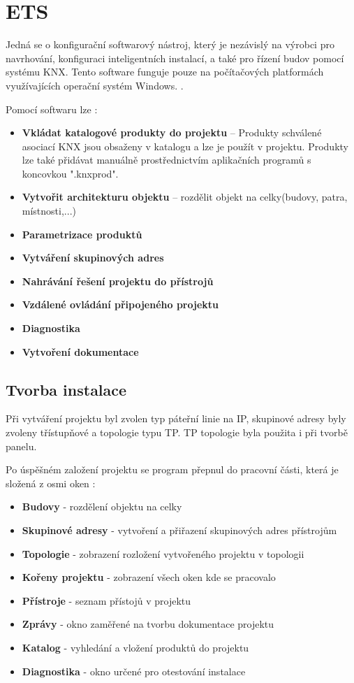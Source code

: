 \chapter{ETS}
\label{ETS}
Jedná se o konfigurační softwarový nástroj, který je nezávislý na výrobci pro navrhování, konfiguraci inteligentních instalací, a také pro řízení budov pomocí systému KNX. Tento software funguje pouze na počítačových platformách využívajících operační systém Windows. \cite{ETS Kecy}.

\noindent Pomocí softwaru lze \cite{Mitrenga}:
\begin{itemize}
    \item \textbf{Vkládat katalogové produkty do projektu} -- Produkty schválené asociací KNX jsou obsaženy v katalogu a lze je použít v projektu. Produkty lze také přidávat manuálně prostřednictvím aplikačních programů s koncovkou ".knxprod".
    \item \textbf{Vytvořit architekturu objektu} -- rozdělit objekt na celky(budovy, patra, místnosti,...)
    \item \textbf{Parametrizace produktů}
    \item \textbf{Vytváření skupinových adres}
    \item \textbf{Nahrávání řešení projektu do přístrojů}
    \item \textbf{Vzdálené ovládání připojeného projektu}
    \item \textbf{Diagnostika}
    \item \textbf{Vytvoření dokumentace}
\end{itemize}

\section{Tvorba instalace}
Při vytváření projektu byl zvolen typ páteřní linie na IP, skupinové adresy byly zvoleny třístupňové a topologie typu TP. TP topologie byla použita i při tvorbě panelu.

Po úspěšném založení projektu se program přepnul do pracovní části, která je složená z osmi oken \cite{Mitrenga}:
\begin{itemize}
    \item \textbf{Budovy} - rozdělení objektu na celky
    \item \textbf{Skupinové adresy} - vytvoření a přiřazení skupinových adres přístrojům
    \item \textbf{Topologie} - zobrazení rozložení vytvořeného projektu v topologii
    \item \textbf{Kořeny projektu} - zobrazení všech oken kde se pracovalo
    \item \textbf{Přístroje} - seznam přístojů v projektu
    \item \textbf{Zprávy} - okno zaměřené na tvorbu dokumentace projektu
    \item \textbf{Katalog} - vyhledání a vložení produktů do projektu
    \item \textbf{Diagnostika} - okno určené pro otestování instalace\\
\end{itemize}

